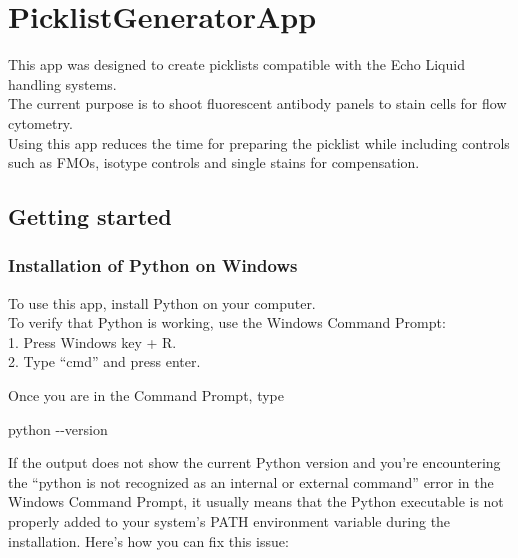 \documentclass[
]{article}
\author{}
\date{\vspace{-2.5em}}
\newenvironment{Shaded}{\begin{snugshade}}{\end{snugshade}}
\newcommand{\NormalTok}[1]{#1}
\begin{document}
\hypertarget{picklistgeneratorapp}{%
\section{PicklistGeneratorApp}\label{picklistgeneratorapp}}

This app was designed to create picklists compatible with the Echo
Liquid handling systems.\\
The current purpose is to shoot fluorescent antibody panels to stain
cells for flow cytometry.\\
Using this app reduces the time for preparing the picklist while
including controls such as FMOs, isotype controls and single stains for
compensation.

\hypertarget{getting-started}{%
\subsection{Getting started}\label{getting-started}}

\hypertarget{installation-of-python-on-windows}{%
\subsubsection{Installation of Python on
Windows}\label{installation-of-python-on-windows}}

To use this app, install Python on your computer.\\
To verify that Python is working, use the Windows Command Prompt:\\
1. Press Windows key + R.\\
2. Type ``cmd'' and press enter.

Once you are in the Command Prompt, type

\begin{Shaded}
\begin{Highlighting}[]
\NormalTok{python {-}{-}version}
\end{Highlighting}
\end{Shaded}

If the output does not show the current Python version and you're
encountering the ``python is not recognized as an internal or external
command'' error in the Windows Command Prompt, it usually means that the
Python executable is not properly added to your system's PATH
environment variable during the installation. Here's how you can fix
this issue:
\end{document}
